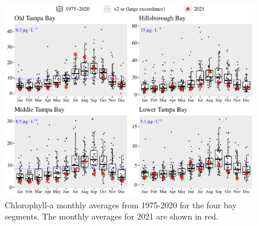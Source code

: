 \documentclass[final,t]{beamer}\usepackage[]{graphicx}\usepackage[]{color}
\begin{document}
\begin{frame}
\begin{columns}[t]
\begin{column}{.79\linewidth}
\begin{figure}
\centerline{\includegraphics[trim = 0cm 0cm 0cm 0cm, width=1\linewidth]{figure/chlboxplot.pdf}}
\caption{\footnotesize Chlorophyll-a monthly averages from 1975-2020 for the four bay segments. The monthly averages for 2021 are shown in red.}
\label{fig:chlboxplot}
\end{figure}

\vspace{-0.4in}


\end{column}
\end{columns}
\end{frame}
\end{document}
